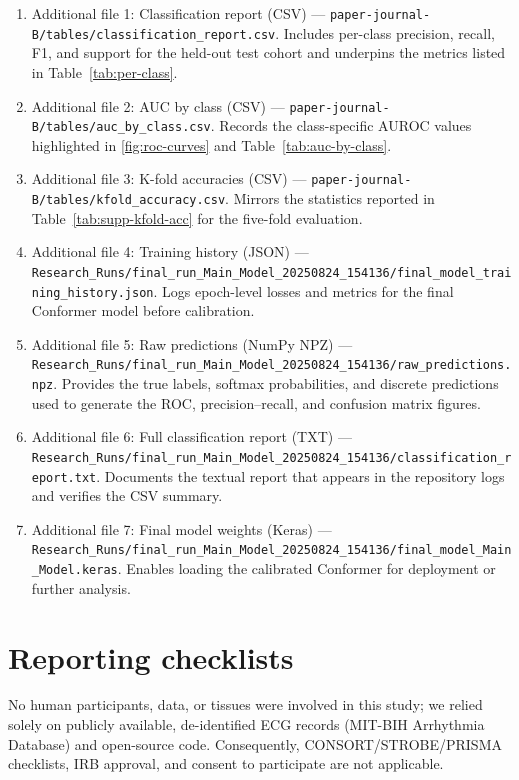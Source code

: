 \begin{enumerate}
  \item Additional file 1: Classification report (CSV) — \texttt{paper-journal-B/tables/classification\_report.csv}. Includes per-class precision, recall, F1, and support for the held-out test cohort and underpins the metrics listed in Table~\ref{tab:per-class}.
  \item Additional file 2: AUC by class (CSV) — \texttt{paper-journal-B/tables/auc\_by\_class.csv}. Records the class-specific AUROC values highlighted in \autoref{fig:roc-curves} and Table~\ref{tab:auc-by-class}.
  \item Additional file 3: K-fold accuracies (CSV) — \texttt{paper-journal-B/tables/kfold\_accuracy.csv}. Mirrors the statistics reported in Table~\ref{tab:supp-kfold-acc} for the five-fold evaluation.
  \item Additional file 4: Training history (JSON) — \texttt{Research\_Runs/final\_run\_Main\_Model\_20250824\_154136/final\_model\_training\_history.json}. Logs epoch-level losses and metrics for the final Conformer model before calibration.
  \item Additional file 5: Raw predictions (NumPy NPZ) — \texttt{Research\_Runs/final\_run\_Main\_Model\_20250824\_154136/raw\_predictions.npz}. Provides the true labels, softmax probabilities, and discrete predictions used to generate the ROC, precision--recall, and confusion matrix figures.
  \item Additional file 6: Full classification report (TXT) — \texttt{Research\_Runs/final\_run\_Main\_Model\_20250824\_154136/classification\_report.txt}. Documents the textual report that appears in the repository logs and verifies the CSV summary.
  \item Additional file 7: Final model weights (Keras) — \texttt{Research\_Runs/final\_run\_Main\_Model\_20250824\_154136/final\_model\_Main\_Model.keras}. Enables loading the calibrated Conformer for deployment or further analysis.
\end{enumerate}

\section{Reporting checklists}
No human participants, data, or tissues were involved in this study; we relied solely on publicly available, de-identified ECG records (MIT-BIH Arrhythmia Database) and open-source code. Consequently, CONSORT/STROBE/PRISMA checklists, IRB approval, and consent to participate are not applicable.
